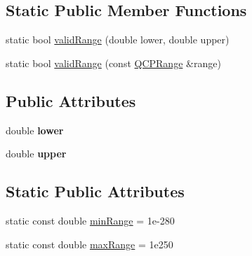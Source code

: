 \subsection*{Static Public Member Functions}
\begin{DoxyCompactItemize}
\item 
static bool \hyperlink{classQCPRange_ab38bd4841c77c7bb86c9eea0f142dcc0}{valid\+Range} (double lower, double upper)
\item 
static bool \hyperlink{classQCPRange_a801b964752eaad6219be9d8a651ec2b3}{valid\+Range} (const \hyperlink{classQCPRange}{Q\+C\+P\+Range} \&range)
\end{DoxyCompactItemize}
\subsection*{Public Attributes}
\begin{DoxyCompactItemize}
\item 
double {\bfseries lower}\hypertarget{classQCPRange_aa3aca3edb14f7ca0c85d912647b91745}{}\label{classQCPRange_aa3aca3edb14f7ca0c85d912647b91745}

\item 
double {\bfseries upper}\hypertarget{classQCPRange_ae44eb3aafe1d0e2ed34b499b6d2e074f}{}\label{classQCPRange_ae44eb3aafe1d0e2ed34b499b6d2e074f}

\end{DoxyCompactItemize}
\subsection*{Static Public Attributes}
\begin{DoxyCompactItemize}
\item 
static const double \hyperlink{classQCPRange_ab46d3bc95030ee25efda41b89e2b616b}{min\+Range} = 1e-\/280
\item 
static const double \hyperlink{classQCPRange_a5ca51e7a2dc5dc0d49527ab171fe1f4f}{max\+Range} = 1e250
\end{DoxyCompactItemize}
